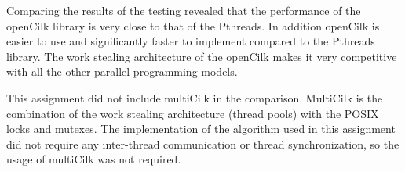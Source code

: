 Comparing the results of the testing revealed that the performance of the 
openCilk library is very close to that of the Pthreads. In addition openCilk
is easier to use and significantly faster to implement compared to the Pthreads
library. The work stealing architecture of the openCilk makes it very 
competitive with all the other parallel programming models.

This assignment did not include multiCilk in the comparison. MultiCilk is the 
combination of the work stealing architecture (thread pools) with the POSIX 
locks and mutexes. The implementation of the algorithm used in this assignment
did not require any inter-thread communication or thread synchronization, so
the usage of multiCilk was not required. 